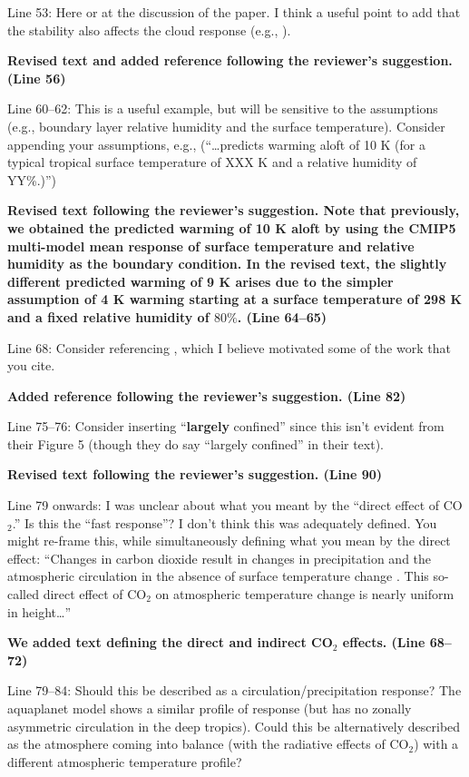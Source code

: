 \documentclass[11pt]{article}
\begin{document}
Line 53: Here or at the discussion of the \cite{andrews_dependence_2018} paper. I think a useful point to add that the stability also affects the cloud response (e.g., \cite{zhou_impact_2016}).

\textbf{Revised text and added reference following the reviewer's suggestion. (Line 56)}

Line 60--62: This is a useful example, but will be sensitive to the assumptions (e.g., boundary layer relative humidity and the surface temperature). Consider appending your assumptions, e.g., (``\ldots{}predicts warming aloft of 10 K (for a typical tropical surface temperature of XXX K and a relative humidity of YY\%.)'')

\textbf{Revised text following the reviewer's suggestion. Note that previously, we obtained the predicted warming of 10 K aloft by using the CMIP5 multi-model mean response of surface temperature and relative humidity as the boundary condition. In the revised text, the slightly different predicted warming of 9 K arises due to the simpler assumption of 4 K warming starting at a surface temperature of 298 K and a fixed relative humidity of \(80\%\). (Line 64--65)}

Line 68: Consider referencing \cite{sobel_enso_2002}, which I believe motivated some of the work that you cite.

\textbf{Added reference following the reviewer's suggestion. (Line 82)}

Line 75--76: Consider inserting ``\textbf{largely} confined'' since this isn't evident from their Figure 5 (though they do say ``largely confined'' in their text).

\textbf{Revised text following the reviewer's suggestion. (Line 90)}

Line 79 onwards: I was unclear about what you meant by the ``direct effect of CO\(_2\).'' Is this the ``fast response''? I don't think this was adequately defined. You might re-frame this, while simultaneously defining what you mean by the direct effect: ``Changes in carbon dioxide result in changes in precipitation and the atmospheric circulation in the absence of surface temperature change \cite{bony_robust_2013}. This so-called direct effect of CO\(_2\) on atmospheric temperature change is nearly uniform in height\ldots{}''

\textbf{We added text defining the direct and indirect CO$_2$ effects. (Line 68--72)}

Line 79--84: Should this be described as a circulation/precipitation response? The aquaplanet model shows a similar profile of response (but has no zonally asymmetric circulation in the deep tropics). Could this be alternatively described as the atmosphere coming into balance (with the radiative effects of CO\(_2\)) with a different atmospheric temperature profile?
\end{document}
